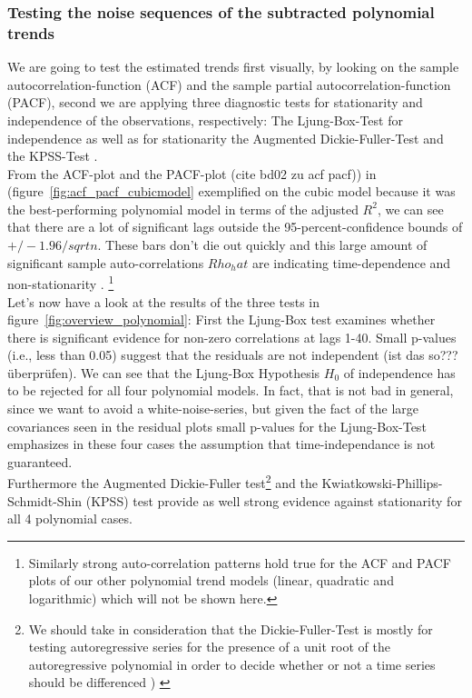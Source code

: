 \documentclass[11pt,a4paper]{article}
\begin{document}
\subsubsection{Testing the noise sequences of the subtracted polynomial trends}
We are going to test the estimated trends first visually, by looking on the sample autocorrelation-function (ACF) and the sample partial autocorrelation-function (PACF), second we are applying three diagnostic tests for stationarity and independence of the observations, respectively: The Ljung-Box-Test \citep{LjungBox78} for independence as well as for stationarity the Augmented Dickie-Fuller-Test \citep{adf} and the KPSS-Test \citep{kpss92}. \\

From the ACF-plot and the PACF-plot (cite bd02 zu acf pacf))  in (figure~\ref{fig:acf_pacf_cubicmodel}  exemplified on the cubic model because it was the best-performing polynomial model  in terms of the adjusted $R^2$, we can see that there are a lot of significant lags outside the 95-percent-confidence bounds of $+/-1.96/sqrt{n}$.  These bars don't die out quickly and this large amount of significant sample auto-correlations $Rho_hat$ are indicating time-dependence and non-stationarity \cite[p.~21]{bd02}. \footnote{Similarly strong auto-correlation patterns hold true for the ACF and PACF plots of our other polynomial trend models (linear, quadratic and logarithmic) which will not be shown here.}\\
Let's now have a look at the results of the three tests in figure~\ref{fig:overview_polynomial}: First the Ljung-Box test examines whether there is significant evidence for non-zero correlations at lags 1-40. Small p-values (i.e., less than 0.05) suggest that the residuals are not independent (ist das so??? überprüfen). We can see that the Ljung-Box Hypothesis $H_0$ of independence has to be rejected for all four polynomial models. In fact, that is not bad in general, since we want to avoid a white-noise-series, but given the fact of the large covariances seen in the residual plots small p-values for the Ljung-Box-Test emphasizes in these four  cases the assumption that time-independance is not guaranteed. \\
Furthermore the Augmented Dickie-Fuller test\footnote{We should take in consideration that the Dickie-Fuller-Test is mostly for testing autoregressive series for the presence of a unit root of the autoregressive polynomial in order to decide whether or not a time series should be differenced \cite[p.~194]{bd02} ) \citep{adf}} and the Kwiatkowski-Phillips-Schmidt-Shin (KPSS) test provide as well strong evidence against stationarity for all 4 polynomial cases. 
\\
\end{document}
